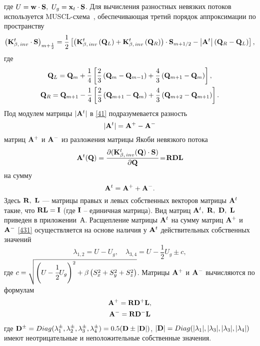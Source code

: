 где $U = {\bf{w}} \cdot {\bf{S}},\ U_g  = {\bf{x}}_t  \cdot {\bf{S}}$. Для вычисления разностных невязких 
потоков используется MUSCL-схема~\cite{anders}, обеспечивающая третий порядок аппроксимации по пространству
\begin{equation}
  \label{41} 
  \left( {{\bf{K}}_{\beta,\, inv}^t  \cdot {\bf{S}}} \right)_{m + \frac{1}{2}} = 
  \frac{1}{2}\left[ {\left( {{\bf{K}}_{\beta,\, inv}^t \left( {{\bf{Q}}_L } \right) +
  {\bf{K}}_{\beta,\, inv}^t \left( {{\bf{Q}}_R } \right)} \right) \cdot {\bf{S}}_{m + 1/2} - 
  \left| {{\bf{A}}^t } \right|\left({{\bf{Q}}_R  - {\bf{Q}}_L } \right)} \right],
\end{equation}
где
\begin{gather}
  \label{42}
  {\bf{Q}}_L  = {\bf{Q}}_m  + \frac{1}{4} \left[ {\frac{2}{3}\left( {{\bf{Q}}_m  - {\bf{Q}}_{m - 1} } 
  \right) + \frac{4}{3}\left( {{\bf{Q}}_{m + 1}  - {\bf{Q}}_m } \right)} \right],\notag \\
  {\bf{Q}}_R  = {\bf{Q}}_{m + 1}  - \frac{1}{4} \left[ {\frac{2}{3}\left( {{\bf{Q}}_{m + 1}  - {\bf{Q}}_m } 
  \right) + \frac{4}{3}\left( {{\bf{Q}}_{m + 2}  - {\bf{Q}}_{m + 1} } \right)} \right].
\end{gather}
Под модулем матрицы $|{\bf{A}}^t|$ в \eqref{41} подразумевается разность
\begin{equation}
  |{\bf{A}}^t|={\bf{A}}^+-{\bf{A}}^-
\end{equation}
матриц ${\bf{A}}^+$ и ${\bf{A}}^-$ из разложения матрицы Якоби невязкого потока
\begin{equation}
  {\bf{A}}^t ({\bf{Q}}) = \frac{{\partial ({\bf{K}}_{\beta,\, inv}^t ({\bf{Q}}) \cdot {\bf{S}})}}{{\partial
  {\bf{Q}}}} \!=\! {\bf{R}}{\bf{D}}{\bf{L}}
  \label{43} 
\end{equation}
на сумму
\begin{equation}
  \label{431} 
  {\bf{A}}^t={\bf{A}}^++{\bf{A}}^-.
\end{equation}
Здесь ${\bf{R}},\ {\bf{L}}$ --- матрицы правых и левых собственных векторов матрицы ${\bf{A}}^t$ такие, 
что ${\bf{R}}{\bf{L}}={\bf{I}}$ (где ${\bf{I}}$ -- единичная матрица). Вид 
матриц ${\bf{A}}^t,\ {\bf{R}},\ {\bf{D}},\ {\bf{L}}$ приведен в приложении~А. 
Расщепление матрицы ${\bf{A}}^t$ на сумму матриц ${\bf{A}}^+$ и ${\bf{A}}^-$ \eqref{431} осуществляется на 
основе наличия у ${\bf{A}}^t$ действительных собственных значений
\begin{equation}
  \label{44}
  \lambda _{1,2}  = U_{}  - U_g , \quad
  \lambda _{3,4}  = U_{}  - \frac{1}{2}U_g \pm c,
\end{equation}
где $c = \sqrt {\left({U_{} -\cfrac{1}{2}U_g} \right)^2 + \beta \left( {S_x^2  + S_y^2  + S_z^2 } \right)}$.
Матрицы ${\bf{A}}^+$ и ${\bf{A}}^-$ вычисляются по формулам
\begin{gather}
  {\bf{A}}^+ = {\bf{R}}{\bf{D}}^+{\bf{L}}, \notag \\
  {\bf{A}}^- = {\bf{R}}{\bf{D}}^-{\bf{L}} \notag
\end{gather}
где ${\bf{D}}^{\pm}=Diag(\lambda_{1}^{\pm},\lambda_{2}^{\pm},\lambda_{3}^{\pm},\lambda_{4}^{\pm})=0.5({\bf{D}}
\pm |{\bf{D}}|)$, $|{\bf{D}}|=Diag(|\lambda_{1}|,|\lambda_{3}|,|\lambda_{3}|,|\lambda_{4}|)$ имеют 
неотрицательные и неположительные собственные значения. 


